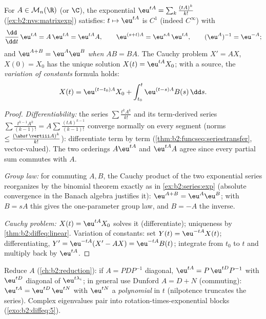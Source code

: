 \begin{theorem}\label{thm:b2:diffeq:matrixexp}
For $A \in \mathcal{M}_n(\R)$ (or $\C$), the exponential $\eu^{tA}
= \sum_k \frac{(tA)^k}{k!}$ (\cref{ex:b2:nvs:matrixexp}) satisfies:
$t \mapsto \eu^{tA}$ is $C^1$ (indeed $C^\infty$)
with
\[
\frac{\dd}{\dd t}\,\eu^{tA} = A\,\eu^{tA} = \eu^{tA}A ,
\qquad
\eu^{(s+t)A} = \eu^{sA}\,\eu^{tA},
\qquad
(\eu^{A})^{-1} = \eu^{-A} ;
\]
and $\eu^{A + B} = \eu^A\eu^B$ \emph{when} $AB = BA$. The Cauchy
problem $X' = AX$, $X(0) = X_0$ has the unique solution $X(t) =
\eu^{tA}X_0$; with a source, the \emph{variation of constants}
formula holds:
\[
X(t) = \eu^{(t - t_0)A}X_0 + \int_{t_0}^{t} \eu^{(t-s)A}B(s)\,\dd
s .
\]
\end{theorem}

\begin{proof}
\emph{Differentiability:} the series $\sum \frac{t^kA^k}{k!}$ and
its term-derived series $\sum \frac{t^{k-1}A^k}{(k-1)!} = A\sum
\frac{(tA)^{k-1}}{(k-1)!}$ converge normally on every segment
(norms $\leq \frac{(\abs t\,\vertiii A)^k}{k!}$): differentiate
term by term (\cref{thm:b2:funcseq:seriestransfer}, vector-valued).
The two orderings $A\eu^{tA}$ and $\eu^{tA}A$ agree since every
partial sum commutes with $A$.

\emph{Group law:} for commuting $A, B$, the Cauchy product of the
two exponential series reorganizes by the binomial theorem exactly
as in \cref{ex:b2:series:exp} (absolute convergence in the Banach
algebra justifies it): $\eu^{A+B} = \eu^A\eu^B$; with $B = sA$ this
gives the one-parameter group law, and $B = -A$ the inverse.

\emph{Cauchy problem:} $X(t) = \eu^{tA}X_0$ solves it (differentiate);
uniqueness by \cref{thm:b2:diffeq:linear}. Variation of constants:
set $Y(t) = \eu^{-tA}X(t)$; differentiating, $Y' = \eu^{-tA}(X' -
AX) = \eu^{-tA}B(t)$; integrate from $t_0$ to $t$ and multiply
back by $\eu^{tA}$.
\end{proof}

\begin{method}[Computing $\eu^{tA}$]\label{met:b2:diffeq:computeexp}
Reduce $A$ (\cref{ch:b2:reduction}): if $A = PDP^{-1}$ diagonal,
$\eu^{tA} = P\,\eu^{tD}P^{-1}$ with $\eu^{tD}$ diagonal of
$\eu^{t\lambda_i}$; in general use Dunford $A = D + N$
(commuting): $\eu^{tA} = \eu^{tD}\,\eu^{tN}$ with $\eu^{tN}$ a
\emph{polynomial} in $t$ (nilpotence truncates the series). Complex
eigenvalues pair into rotation-times-exponential blocks
(\cref{exo:b2:diffeq:5}).
\end{method}

